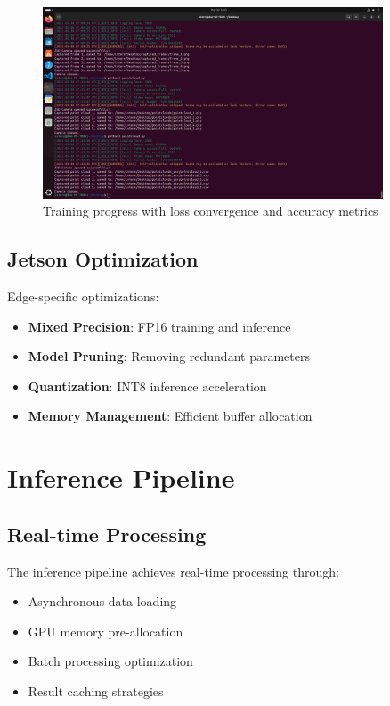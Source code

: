 \documentclass[12pt,a4paper]{report}
\begin{document}
\begin{figure}[htbp]
    \centering
    \includegraphics[width=0.9\textwidth]{figures/early_experiments.png}
    \caption{Training progress with loss convergence and accuracy metrics}
    \label{fig:training_progress}
\end{figure}

\subsection{Jetson Optimization}

Edge-specific optimizations:
\begin{itemize}
    \item \textbf{Mixed Precision}: FP16 training and inference
    \item \textbf{Model Pruning}: Removing redundant parameters
    \item \textbf{Quantization}: INT8 inference acceleration
    \item \textbf{Memory Management}: Efficient buffer allocation
\end{itemize}

\section{Inference Pipeline}

\subsection{Real-time Processing}

The inference pipeline achieves real-time processing through:
\begin{itemize}
    \item Asynchronous data loading
    \item GPU memory pre-allocation
    \item Batch processing optimization
    \item Result caching strategies
\end{itemize}
\end{document}
